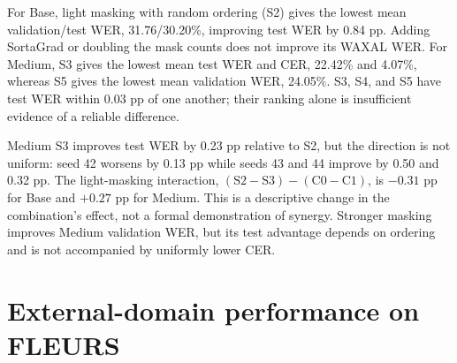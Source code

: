 \documentclass[12pt,a4paper]{report}
\begin{document}
For Base, light masking with random ordering (S2) gives the lowest mean
validation/test WER, 31.76/30.20\%, improving test WER by 0.84 pp.
Adding SortaGrad or doubling the mask counts does not improve its WAXAL
WER. For Medium, S3 gives the lowest mean test WER and CER, 22.42\% and
4.07\%, whereas S5 gives the lowest mean validation WER, 24.05\%.
S3, S4, and S5 have test WER within 0.03 pp of one another; their ranking
alone is insufficient evidence of a reliable difference.

Medium S3 improves test WER by 0.23 pp relative to S2, but the direction
is not uniform: seed 42 worsens by 0.13 pp while seeds 43 and 44 improve
by 0.50 and 0.32 pp. The light-masking interaction,
$(\mathrm{S2}-\mathrm{S3})-(\mathrm{C0}-\mathrm{C1})$, is $-0.31$ pp
for Base and $+0.27$ pp for Medium. This is a descriptive change in the
combination's effect, not a formal demonstration of synergy. Stronger
masking improves Medium validation WER, but its test advantage depends on
ordering and is not accompanied by uniformly lower CER.

\section{External-domain performance on FLEURS}
\label{sec:fleurs}
\end{document}
